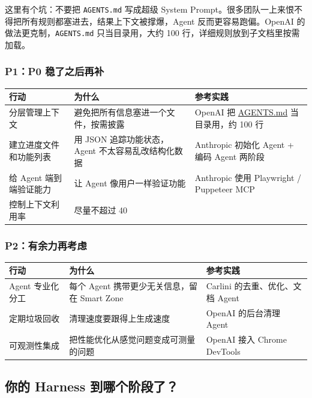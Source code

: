 \documentclass[10pt,a4paper]{ctexart}
\begin{document}
这里有个坑：不要把 \texttt{AGENTS.md} 写成超级 System Prompt。很多团队一上来恨不得把所有规则都塞进去，结果上下文被撑爆，Agent 反而更容易跑偏。OpenAI 的做法更克制，\texttt{AGENTS.md} 只当目录用，大约 100 行，详细规则放到子文档里按需加载。



\subsubsection{P1：P0 稳了之后再补}

{\footnotesize
\begin{tabularx}{\textwidth}{|X|X|X|}
\hline
\textbf{行动} & \textbf{为什么} & \textbf{参考实践} \\
\hline
分层管理上下文 & 避免把所有信息塞进一个文件，按需披露 & OpenAI 把 \href{http://agents.md/}{AGENTS.md} 当目录用，约 100 行 \\
\hline
建立进度文件和功能列表 & 用 JSON 追踪功能状态，Agent 不太容易乱改结构化数据 & Anthropic 初始化 Agent + 编码 Agent 两阶段 \\
\hline
给 Agent 端到端验证能力 & 让 Agent 像用户一样验证功能 & Anthropic 使用 Playwright / Puppeteer MCP \\
\hline
控制上下文利用率 & 尽量不超过 40\\%
\hline
\end{tabularx}
}



\subsubsection{P2：有余力再考虑}

{\footnotesize
\begin{tabularx}{\textwidth}{|X|X|X|}
\hline
\textbf{行动} & \textbf{为什么} & \textbf{参考实践} \\
\hline
Agent 专业化分工 & 每个 Agent 携带更少无关信息，留在 Smart Zone & Carlini 的去重、优化、文档 Agent \\
\hline
定期垃圾回收 & 清理速度要跟得上生成速度 & OpenAI 的后台清理 Agent \\
\hline
可观测性集成 & 把性能优化从感觉问题变成可测量的问题 & OpenAI 接入 Chrome DevTools \\
\hline
\end{tabularx}
}



\subsection{你的 Harness 到哪个阶段了？}
\end{document}
